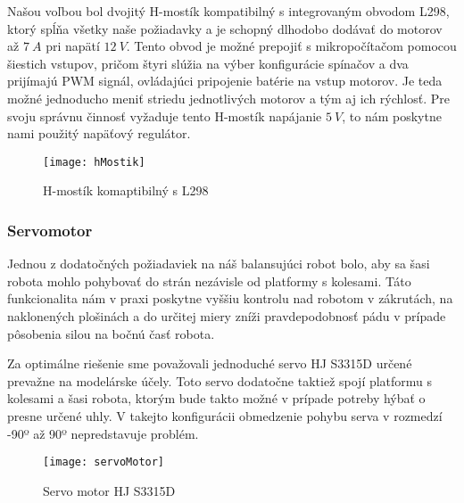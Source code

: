 Našou voľbou bol dvojitý H-mostík kompatibilný s integrovaným obvodom L298, ktorý spĺňa všetky naše požiadavky a je schopný dlhodobo dodávať do motorov až $7~A$ pri napätí $12~V$. Tento obvod je možné prepojiť s mikropočítačom pomocou šiestich vstupov, pričom štyri slúžia na výber konfigurácie spínačov a dva prijímajú \ac{PWM} signál, ovládajúci pripojenie batérie na vstup motorov. Je teda možné jednoducho meniť striedu jednotlivých motorov a tým aj ich rýchlosť. Pre svoju správnu činnosť vyžaduje tento H-mostík napájanie $5~V$, to nám poskytne nami použitý napäťový regulátor. 

\begin{figure}
\centering
\texttt{[image: hMostik]}
\caption{H-mostík komaptibilný s L298\cite{hBridge}}
\label{fig:hMostik}
\end{figure}

\subsubsection{Servomotor}
Jednou z dodatočných požiadaviek na náš balansujúci robot bolo, aby sa šasi robota mohlo pohybovať do strán nezávisle od platformy s kolesami. Táto funkcionalita nám v praxi poskytne vyššiu kontrolu nad robotom v zákrutách, na naklonených plošinách a do určitej miery zníži pravdepodobnosť pádu v prípade pôsobenia silou na bočnú časť robota.

Za optimálne riešenie sme považovali jednoduché servo HJ S3315D určené prevažne na modelárske účely. Toto servo dodatočne taktiež spojí platformu s kolesami a šasi robota, ktorým bude takto možné v prípade potreby hýbať o presne určené uhly. V takejto konfigurácii  obmedzenie pohybu serva v rozmedzí -90º až 90º nepredstavuje problém.


\begin{figure}[h]
\centering
\texttt{[image: servoMotor]}
\caption{Servo motor HJ S3315D\cite{servoMotor}}
\label{fig:servoMotor}
\end{figure}
